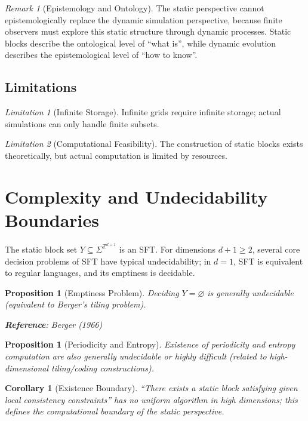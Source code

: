 \documentclass[11pt]{article}
\newtheorem{proposition}[theorem]{Proposition}
\newtheorem{corollary}[theorem]{Corollary}
\theoremstyle{definition}
\theoremstyle{remark}
\newtheorem{remark}[theorem]{Remark}
\newtheorem{limitation}{Limitation}
\begin{document}
\begin{remark}[Epistemology and Ontology]
The static perspective cannot epistemologically replace the dynamic simulation perspective, because finite observers must explore this static structure through dynamic processes. Static blocks describe the ontological level of ``what is'', while dynamic evolution describes the epistemological level of ``how to know''.
\end{remark}

\subsection{Limitations}

\begin{limitation}[Infinite Storage]
Infinite grids require infinite storage; actual simulations can only handle finite subsets.
\end{limitation}

\begin{limitation}[Computational Feasibility]
The construction of static blocks exists theoretically, but actual computation is limited by resources.
\end{limitation}

\section{Complexity and Undecidability Boundaries}\label{sec:complexity}

The static block set \( Y \subseteq \Sigma^{\mathbb{Z}^{d+1}} \) is an SFT. For dimensions \( d+1 \ge 2 \), several core decision problems of SFT have typical undecidability; in \( d = 1 \), SFT is equivalent to regular languages, and its emptiness is decidable.

\begin{proposition}[Emptiness Problem]\label{prop:emptiness}
Deciding \( Y = \varnothing \) is generally undecidable (equivalent to Berger's tiling problem).

\textbf{Reference}: Berger (1966)
\end{proposition}

\begin{proposition}[Periodicity and Entropy]\label{prop:period}
Existence of periodicity and entropy computation are also generally undecidable or highly difficult (related to high-dimensional tiling/coding constructions).
\end{proposition}

\begin{corollary}[Existence Boundary]\label{cor:boundary}
``There exists a static block satisfying given local consistency constraints'' has no uniform algorithm in high dimensions; this defines the computational boundary of the static perspective.
\end{corollary}
\end{document}
